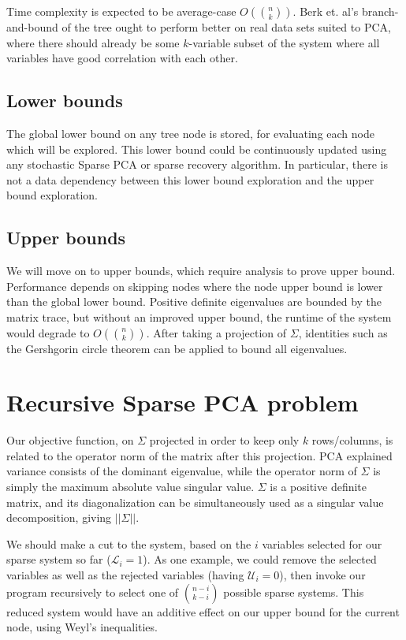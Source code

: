 \documentclass{article}
\begin{document}
Time complexity is expected to be average-case $O\left(\binom{n}{k}\right)$. Berk et. al's branch-and-bound of the tree ought to perform better on real data sets suited to PCA, where there should already be some $k$-variable subset of the system where all variables have good correlation with each other.

\subsection{Lower bounds}

The global lower bound on any tree node is stored, for evaluating each node which will be explored. This lower bound could be continuously updated using any stochastic Sparse PCA or sparse recovery algorithm. In particular, there is not a data dependency between this lower bound exploration and the upper bound exploration.

\subsection{Upper bounds}

We will move on to upper bounds, which require analysis to prove upper bound. Performance depends on skipping nodes where the node upper bound is lower than the global lower bound. Positive definite eigenvalues are bounded by the matrix trace, but without an improved upper bound, the runtime of the system would degrade to $O\left(\binom{n}{k}\right)$. After taking a projection of $\Sigma$, identities such as the Gershgorin circle theorem can be applied to bound all eigenvalues.

\section{Recursive Sparse PCA problem}

Our objective function, on $\Sigma$ projected in order to keep only $k$ rows/columns, is related to the operator norm of the matrix after this projection. PCA explained variance consists of the dominant eigenvalue, while the operator norm of $\Sigma$ is simply the maximum absolute value singular value. $\Sigma$ is a positive definite matrix, and its diagonalization can be simultaneously used as a singular value decomposition, giving $||\Sigma||$.

We should make a cut to the system, based on the $i$ variables selected for our sparse system so far ($\mathcal{L}_i = 1$). As one example, we could remove the selected variables as well as the rejected variables (having $\mathcal{U}_i = 0$), then invoke our program recursively to select one of $\binom{n-i}{k-i}$ possible sparse systems. This reduced system would have an additive effect on our upper bound for the current node, using Weyl's inequalities.
\end{document}
